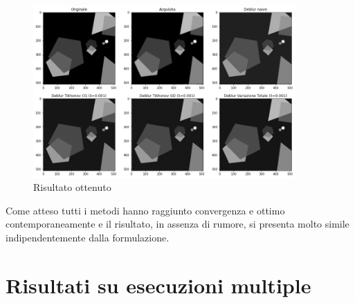 \documentclass[11pt]{article}
\begin{document}
\begin{figure}[H]
    \centering
    \includegraphics[width=10cm]{semiconvergenza/3/deblur_all.png}
    \caption{Risultato ottenuto}
    \label{fig:semiconv_deblur3}
\end{figure}
Come atteso tutti i metodi hanno raggiunto convergenza e ottimo contemporaneamente e il risultato, in assenza di rumore, si presenta molto simile indipendentemente dalla formulazione.

\section{Risultati su esecuzioni multiple}




\end{document}
